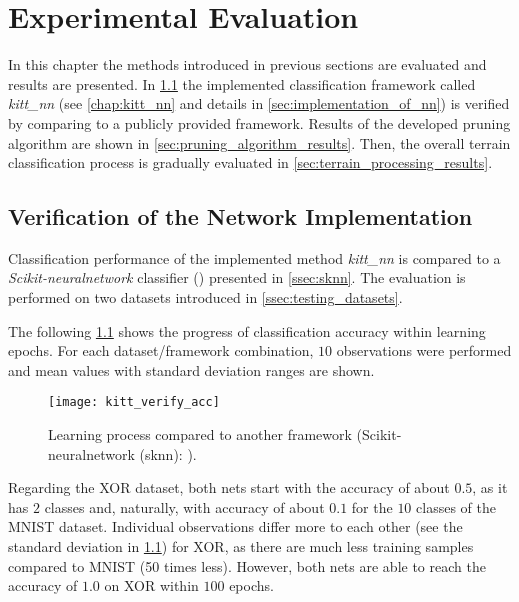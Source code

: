 \chapter{Experimental Evaluation} \label{chap:results}
In this chapter the methods introduced in previous sections are evaluated and results are presented. In \cref{sec:verification_of_nn} the implemented classification framework called \textit{kitt\_nn} (see \cref{chap:kitt_nn} and details in \cref{sec:implementation_of_nn}) is verified by comparing to a publicly provided framework. Results of the developed pruning algorithm are shown in \cref{sec:pruning_algorithm_results}. Then, the overall terrain classification process is gradually evaluated in \cref{sec:terrain_processing_results}.

\section{Verification of the Network Implementation} \label{sec:verification_of_nn}
Classification performance of the implemented method \textit{kitt\_nn} is compared to a \textit{Scikit-neuralnetwork} classifier (\citep{misc:sknn}) presented in \cref{ssec:sknn}. The evaluation is performed on two datasets introduced in \cref{ssec:testing_datasets}.

The following \cref{fig:kitt_verify_acc} shows the progress of classification accuracy within learning epochs. For each dataset/framework combination, $ 10 $ observations were performed and mean values with standard deviation ranges are shown.

\begin{figure}[H]
  \centering
  \texttt{[image: kitt\_verify\_acc]}
  \caption{Learning process compared to another framework (Scikit-neuralnetwork (sknn): \citep{misc:sknn}).}
  \label{fig:kitt_verify_acc}
\end{figure}

Regarding the XOR dataset, both nets start with the accuracy of about $ 0.5 $, as it has $ 2 $ classes and, naturally, with accuracy of about $ 0.1 $ for the $ 10 $ classes of the MNIST dataset. Individual observations differ more to each other (see the standard deviation in \cref{fig:kitt_verify_acc}) for XOR, as there are much less training samples compared to MNIST (50 times less). However, both nets are able to reach the accuracy of $ 1.0 $ on XOR within $ 100 $ epochs.


